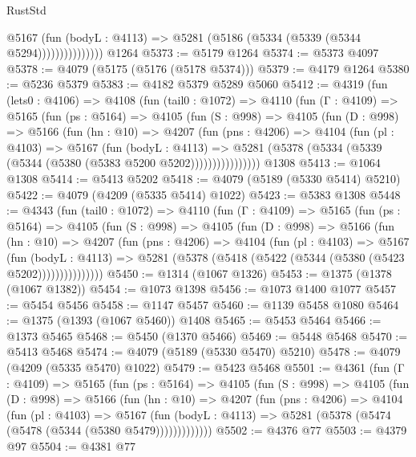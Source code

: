 \begin{lexlean}{RustStd}
\begin{coremodule}
                      @5167
                        (fun (bodyL : @4113) =>
                        @5281 (@5186 (@5334 (@5339 (@5344 @5294)))))))))))))))
    @1264
@5373 := @5179 @1264
@5374 := @5373 @4097
@5378 := @4079 (@5175 (@5176 (@5178 @5374)))
@5379 := @4179 @1264
@5380 := @5236 @5379
@5383 := @4182 @5379 @5289 @5060
@5412 := @4319
    (fun (lets0 : @4106) =>
    @4108
      (fun (tail0 : @1072) =>
      @4110
        (fun (Γ : @4109) =>
        @5165
          (fun (ps : @5164) =>
          @4105
            (fun (S : @998) =>
            @4105
              (fun (D : @998) =>
              @5166
                (fun (hn : @10) =>
                @4207
                  (fun (pns : @4206) =>
                  @4104
                    (fun (pl : @4103) =>
                    @5167
                      (fun (bodyL : @4113) =>
                      @5281 (@5378 (@5334 (@5339 (@5344 (@5380 (@5383 @5200 @5202))))))))))))))))
    @1308
@5413 := @1064 @1308
@5414 := @5413 @5202
@5418 := @4079 (@5189 (@5330 @5414) @5210)
@5422 := @4079 (@4209 (@5335 @5414) @1022)
@5423 := @5383 @1308
@5448 := @4343
    (fun (tail0 : @1072) =>
    @4110
      (fun (Γ : @4109) =>
      @5165
        (fun (ps : @5164) =>
        @4105
          (fun (S : @998) =>
          @4105
            (fun (D : @998) =>
            @5166
              (fun (hn : @10) =>
              @4207
                (fun (pns : @4206) =>
                @4104
                  (fun (pl : @4103) =>
                  @5167
                    (fun (bodyL : @4113) =>
                    @5281 (@5378 (@5418 (@5422 (@5344 (@5380 (@5423 @5202)))))))))))))))
@5450 := @1314 (@1067 @1326)
@5453 := @1375 (@1378 (@1067 @1382))
@5454 := @1073 @1398
@5456 := @1073 @1400 @1077
@5457 := @5454 @5456
@5458 := @1147 @5457
@5460 := @1139 @5458 @1080
@5464 := @1375 (@1393 (@1067 @5460)) @1408
@5465 := @5453 @5464
@5466 := @1373 @5465
@5468 := @5450 (@1370 @5466)
@5469 := @5448 @5468
@5470 := @5413 @5468
@5474 := @4079 (@5189 (@5330 @5470) @5210)
@5478 := @4079 (@4209 (@5335 @5470) @1022)
@5479 := @5423 @5468
@5501 := @4361
    (fun (Γ : @4109) =>
    @5165
      (fun (ps : @5164) =>
      @4105
        (fun (S : @998) =>
        @4105
          (fun (D : @998) =>
          @5166
            (fun (hn : @10) =>
            @4207
              (fun (pns : @4206) =>
              @4104
                (fun (pl : @4103) =>
                @5167
                  (fun (bodyL : @4113) =>
                  @5281 (@5378 (@5474 (@5478 (@5344 (@5380 @5479)))))))))))))
@5502 := @4376 @77
@5503 := @4379 @97
@5504 := @4381 @77

\end{coremodule}
\end{lexlean}
